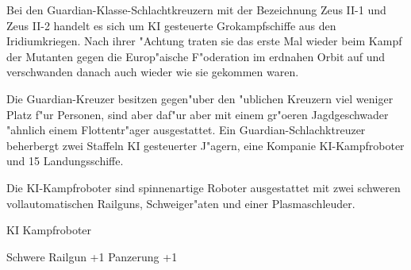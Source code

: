 
Bei den Guardian-Klasse-Schlachtkreuzern mit der Bezeichnung Zeus II-1 und Zeus II-2 handelt es sich um KI gesteuerte Gro\3kampfschiffe aus den Iridiumkriegen. Nach ihrer "Achtung traten sie das erste Mal wieder beim Kampf der Mutanten gegen die Europ"aische F"oderation im erdnahen Orbit auf und verschwanden danach auch wieder wie sie gekommen waren.

Die Guardian-Kreuzer besitzen gegen"uber den "ublichen Kreuzern viel weniger Platz f"ur Personen, sind aber daf"ur aber mit einem gr"o\3eren Jagdgeschwader "ahnlich einem Flottentr"ager ausgestattet. Ein Guardian-Schlachktreuzer beherbergt zwei Staffeln KI gesteuerter J"agern, eine Kompanie KI-Kampfroboter und 15 Landungsschiffe.

Die KI-Kampfroboter sind spinnenartige Roboter ausgestattet mit zwei schweren vollautomatischen Railguns, Schwei\3ger"aten und einer Plasmaschleuder.

\begin{nscsheet}[f]{KI Kampfroboter}
    \nscstats[ATT=3,AGG=3,CON=2]
    \nscruler
    \begin{nscinventory}
        \nscitem[Waffen] Schwere Railgun +1
        \nscitem[R"ustung] Panzerung +1
    \end{nscinventory}
\end{nscsheet}
